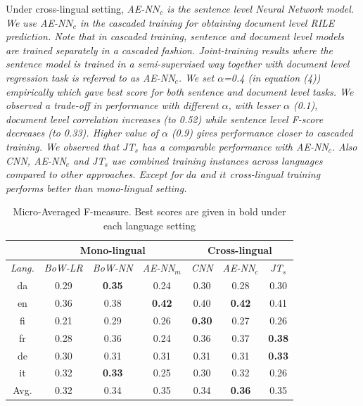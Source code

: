 \documentclass[11pt,a4paper]{article}
\begin{document}
Under cross-lingual setting, \em{AE-N$N_{c}$} \rm is the sentence level Neural Network model. We use \em{AE-N$N_{c}$} \rm in the \textit{cascaded training} for obtaining document level \textit{RILE} prediction. Note that in \textit{cascaded training}, sentence and document level models are trained separately in a cascaded fashion. Joint-training results where the sentence model is trained in a semi-supervised way together with document level regression task is referred to as \em{AE-NN$_{c}$}. \rm We set  $\alpha$=0.4 (in equation (4)) empirically which gave best score for both sentence and document level tasks. We observed a trade-off in performance with different $\alpha$, with lesser $\alpha$ (0.1), document level correlation increases (to 0.52) while sentence level F-score decreases (to 0.33). Higher value of $\alpha$ (0.9) gives performance closer to cascaded training. We observed that \em{JT$_{s}$} \rm has a comparable performance with \em{AE-NN$_{c}$}. \rm Also \em{CNN}, \em{AE-NN$_{c}$} \rm and \em{JT$_{s}$} \rm use combined training instances across languages compared to other approaches. Except for $da$ and $it$ cross-lingual training performs better than mono-lingual setting. 

 \begin{table}[!htp]
  \centering
  \begin{tabular}{ c@{\hskip 0.2in} c c c@{\hskip 0.25in} c c c}
  \toprule
   &  \multicolumn{3}{c}{Mono-lingual} & \multicolumn{3}{c}{Cross-lingual} \\
  \toprule
    \em{Lang.} & \em{BoW-LR} & \em{BoW-NN} & \em{AE-NN}$_{m}$ & \em{CNN} & \em{AE-NN}$_{c}$ & \em{JT}$_{s}$\\
    \midrule
    da  & 	0.29 & \textbf{0.35} & 0.24 & 0.30 & 0.28 & 0.30\\
    en   &  0.36 & 0.38 & \textbf{0.42} & 0.40 & \textbf{0.42} & 0.41\\    	
    fi  &   0.21 & 0.29 & 0.26 & \textbf{0.30} & 0.27 & 0.26\\
    fr    & 0.28 & 0.36 & 0.24 & 0.36 & 0.37 & \textbf{0.38} \\
    de    &  0.30 & 0.31 & 0.31 & 0.31 & 0.31 & \textbf{0.33}\\
    it    & 0.32 & \textbf{0.33} & 0.25 & 0.30 & 0.32 & 0.26\\
\midrule
Avg.    & 0.32 & 0.34 & 0.35 & 0.34 & \textbf{0.36} & 0.35\\

 \bottomrule

  \end{tabular}
  \caption{Micro-Averaged F-measure. Best scores are given in bold under each language setting}
  \label{tab:al}
\end{table}
\end{document}
